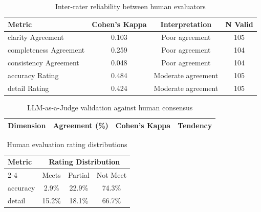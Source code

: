 
\begin{table}[ht]
\centering
\caption{Inter-rater reliability between human evaluators}
\begin{tabular}{lccc}
\toprule
Metric & Cohen's Kappa & Interpretation & N Valid \\
\midrule
clarity Agreement & 0.103 & Poor agreement & 105 \\
completeness Agreement & 0.259 & Poor agreement & 104 \\
consistency Agreement & 0.048 & Poor agreement & 104 \\
accuracy Rating & 0.484 & Moderate agreement & 105 \\
detail Rating & 0.424 & Moderate agreement & 105 \\
\bottomrule
\end{tabular}
\label{tab:inter_rater_reliability}
\end{table}



\begin{table}[ht]
\centering
\caption{LLM-as-a-Judge validation against human consensus}
\begin{tabular}{lccc}
\toprule
Dimension & Agreement (\%) & Cohen's Kappa & Tendency \\
\midrule
\bottomrule
\end{tabular}
\label{tab:llm_validation}
\end{table}



\begin{table}[ht]
\centering
\caption{Human evaluation rating distributions}
\begin{tabular}{lccc}
\toprule
\multirow{2}{*}{Metric} & \multicolumn{3}{c}{Rating Distribution} \\
\cmidrule{2-4}
& Meets & Partial & Not Meet \\
\midrule
accuracy & 2.9\% & 22.9\% & 74.3\% \\
detail & 15.2\% & 18.1\% & 66.7\% \\
\bottomrule
\end{tabular}
\label{tab:rating_distributions}
\end{table}


